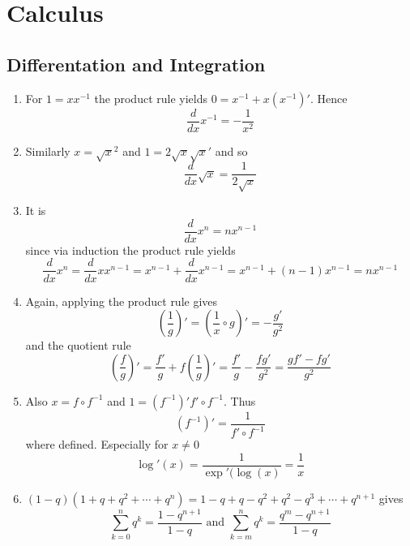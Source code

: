
\newpage
\section{Calculus}

\subsection{Differentation and Integration}


\begin{lemma}\hfill
    \begin{enumerate}
        \item For \( 1 = x x^{-1} \) the product rule yields \( 0 = x^{-1} + x(x^{-1})' \). Hence
            \[
                \frac{d}{dx} x^{-1} = -\frac{1}{x^2}
            \]
        \item Similarly \( x = \sqrt{x}^2 \) and \( 1 = 2 \sqrt{x} \sqrt{x}' \) and so
            \[
                \frac{d}{dx} \sqrt{x} = \frac{1}{2\sqrt{x}}
            \]
        \item It is 
            \[
                \frac{d}{dx} x^n = nx^{n - 1}
            \]
			since via induction the product rule yields
            \[
                \frac{d}{dx} x^n = \frac{d}{dx} xx^{n -1} = x^{n -1} + \frac{d}{dx} x^{n - 1} = 
					x^{n -1} + (n - 1)x^{n - 1}  = nx^{n - 1}
            \]
        \item Again, applying the product rule gives
			\[
            	\left(\frac{1}{g}\right)' = \left(\frac{1}{x} \circ g\right)' = -\frac{g'}{g^2}
			\]
			and the quotient rule
			\[
            	\left(\frac{f}{g}\right)' = \frac{f'}{g} + f \left(\frac{1}{g} \right)' = 
					\frac{f'}{g} -\frac{fg'}{g^2} = \frac{gf'- fg'}{g^2} 
			\]
        \item Also \( x = f \circ f^{-1} \) and \( 1 = (f^{-1})'f' \circ f^{-1} \). Thus
            \[
                (f^{-1})' = \frac{1}{f' \circ f^{-1}}
            \]
			where defined. Especially for \( x \ne 0 \) 
            \[
                \log'(x) = \frac{1}{\exp'(\log(x)} = \frac{1}{x}
            \]
			
        \item \( (1 - q) (1 + q + q^2 + \cdots + q^n) = 1 - q + q - q^2 + q^2 - q^3 + \cdots + q^{n+1} \) gives
            \[
                \sum_{k=0}^n q^k = \frac{1 - q^{n+1}}{1 - q} \text{ and }
                \sum_{k=m}^n q^k = \frac{q^m - q^{n+1}}{1 - q}
            \]
    \end{enumerate}
\end{lemma}
\bigskip


